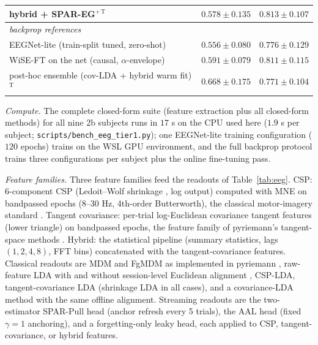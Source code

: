 \documentclass[11pt]{article}
\begin{document}
\begin{table}[h]
\begin{tabular}{lcc}
hybrid + SPAR-EG$^{+\,{\mathrm{T}}}$ & $0.578 \pm 0.135$ & $0.813 \pm 0.107$ \\
\midrule
\multicolumn{3}{l}{\emph{backprop references}}\\
EEGNet-lite (train-split tuned, zero-shot) & $0.556 \pm 0.080$ & $0.776 \pm 0.129$ \\
WiSE-FT on the net (causal, $\alpha$-envelope) & $0.591 \pm 0.079$ & $0.811 \pm 0.115$ \\
\midrule
post-hoc ensemble (cov-LDA + hybrid warm fit)$^{\mathrm{T}}$ & $\mathbf{0.668 \pm 0.175}$ & $0.771 \pm 0.104$ \\
\bottomrule
\end{tabular}
\end{table}

\emph{Compute.}
The complete closed-form suite (feature extraction plus all closed-form methods) for all nine 2b subjects runs in $17$ s on the CPU used here ($1.9$ s per subject; \texttt{scripts/bench\_eeg\_tier1.py}); one EEGNet-lite training configuration ($120$ epochs) trains on the WSL GPU environment, and the full backprop protocol trains three configurations per subject plus the online fine-tuning pass.

\emph{Feature families.}
Three feature families feed the readouts of Table~\ref{tab:eeg}.
CSP: 6-component CSP (Ledoit--Wolf shrinkage \citep{ledoitwolf2004}, log output) computed with MNE \citep{gramfort2013mne} on bandpassed epochs (8--30 Hz, 4th-order Butterworth), the classical motor-imagery standard \citep{ramoser2000csp}.
Tangent covariance: per-trial log-Euclidean covariance tangent features \citep{arsigny2007} (lower triangle) on bandpassed epochs, the feature family of pyriemann's tangent-space methods \citep{barachant2012mdm,barachant2013}.
Hybrid: the statistical pipeline (summary statistics, lags $(1, 2, 4, 8)$, FFT bins) concatenated with the tangent-covariance features.
Classical readouts are MDM and FgMDM \citep{barachant2012mdm,barachant2010riemannian} as implemented in pyriemann \citep{barachant2020pyriemann}, raw-feature LDA with and without session-level Euclidean alignment \citep{he2020ea}, CSP-LDA, tangent-covariance LDA (shrinkage LDA in all cases), and a covariance-LDA method with the same offline alignment.
Streaming readouts are the two-estimator SPAR-Pull head (anchor refresh every 5 trials), the AAL head (fixed $\gamma = 1$ anchoring), and a forgetting-only leaky head, each applied to CSP, tangent-covariance, or hybrid features.
\end{document}
